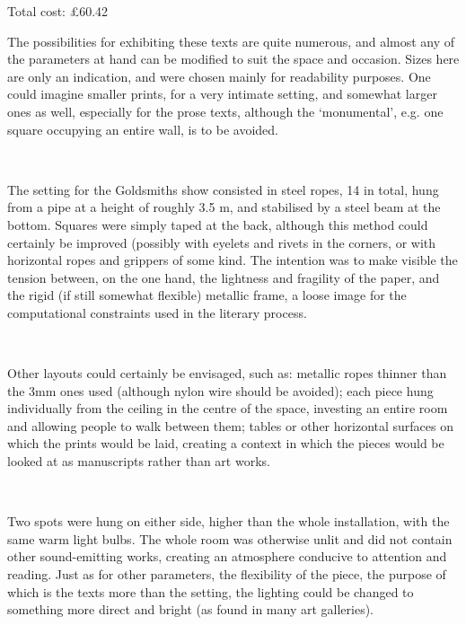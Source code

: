 \documentclass[9pt, twocolumn]{memoir}
\begin{document}
Total cost: £60.42

\vfill\null
\newpage

The possibilities for exhibiting these texts are quite numerous, and almost any of the parameters at hand can be modified to suit the space and occasion. Sizes here are only an indication, and were chosen mainly for readability purposes. One could imagine smaller prints, for a very intimate setting, and somewhat larger ones as well, especially for the prose texts, although the `monumental', e.g. one square occupying an entire wall, is to be avoided. 

\

The setting for the Goldsmiths show consisted in steel ropes, 14 in total, hung from a pipe at a height of roughly 3.5 m, and stabilised by a steel beam at the bottom. Squares were simply taped at the back, although this method could certainly be improved (possibly with eyelets and rivets in the corners, or with horizontal ropes and grippers of some kind. The intention was to make visible the tension between, on the one hand, the lightness and fragility of the paper, and the rigid (if still somewhat flexible) metallic frame, a loose image for the computational constraints used in the literary process. 

\

Other layouts could certainly be envisaged, such as: metallic ropes thinner than the 3mm ones used (although nylon wire should be avoided); each piece hung individually from the ceiling in the centre of the space, investing an entire room and allowing people to walk between them; tables or other horizontal surfaces on which the prints would be laid, creating a context in which the pieces would be looked at as manuscripts rather than art works.

\

Two spots were hung on either side, higher than the whole installation, with the same warm light bulbs. The whole room was otherwise unlit and did not contain other sound-emitting works, creating an atmosphere conducive to attention and reading. Just as for other parameters, the flexibility of the piece, the purpose of which is the texts more than the setting, the lighting could be changed to something more direct and bright (as found in many art galleries).
\end{document}
